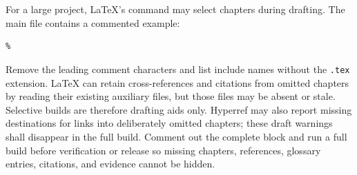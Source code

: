 For a large project, LaTeX's \verb|| command may select chapters
during drafting. The main file contains a commented example:

\begin{verbatim}
% 
\end{verbatim}

Remove the leading comment characters and list include names without the
\texttt{.tex} extension. LaTeX can retain cross-references and citations from
omitted chapters by reading their existing auxiliary files, but those files
may be absent or stale. Selective builds are therefore drafting aids only.
Hyperref may also report missing destinations for links into deliberately
omitted chapters; these draft warnings shall disappear in the full build.
Comment out the complete \verb|| block and run a full build before
verification or release so missing chapters, references, glossary entries,
citations, and evidence cannot be hidden.
